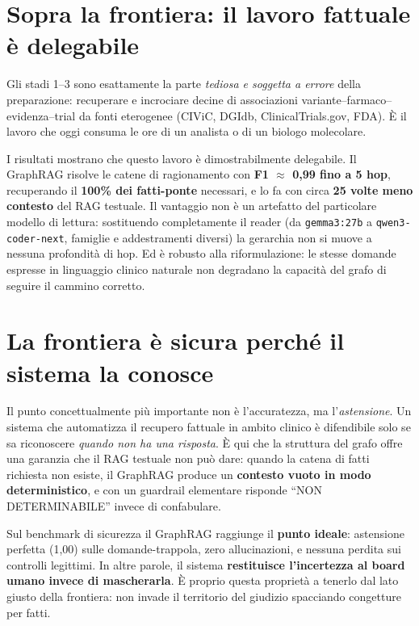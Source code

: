 \documentclass[11pt,a4paper]{report}
\begin{document}
\section{Sopra la frontiera: il lavoro fattuale è delegabile}

Gli stadi 1--3 sono esattamente la parte \emph{tediosa e soggetta a errore}
della preparazione: recuperare e incrociare decine di associazioni
variante--farmaco--evidenza--trial da fonti eterogenee (CIViC, DGIdb,
ClinicalTrials.gov, FDA). È il lavoro che oggi consuma le ore di un analista
o di un biologo molecolare.

I risultati mostrano che questo lavoro è dimostrabilmente delegabile. Il
GraphRAG risolve le catene di ragionamento con \textbf{F1 $\approx$ 0,99
fino a 5 hop}, recuperando il \textbf{100\% dei fatti-ponte} necessari, e lo
fa con circa \textbf{25 volte meno contesto} del RAG testuale. Il vantaggio
non è un artefatto del particolare modello di lettura: sostituendo
completamente il reader (da \texttt{gemma3:27b} a \texttt{qwen3-coder-next},
famiglie e addestramenti diversi) la gerarchia non si muove a nessuna
profondità di hop. Ed è robusto alla riformulazione: le stesse domande
espresse in linguaggio clinico naturale non degradano la capacità del grafo
di seguire il cammino corretto.

\section{La frontiera è sicura perché il sistema la conosce}

Il punto concettualmente più importante non è l'accuratezza, ma
l'\emph{astensione}. Un sistema che automatizza il recupero fattuale in
ambito clinico è difendibile solo se sa riconoscere \emph{quando non ha una
risposta}. È qui che la struttura del grafo offre una garanzia che il RAG
testuale non può dare: quando la catena di fatti richiesta non esiste, il
GraphRAG produce un \textbf{contesto vuoto in modo deterministico}, e con un
guardrail elementare risponde ``NON DETERMINABILE'' invece di confabulare.

Sul benchmark di sicurezza il GraphRAG raggiunge il \textbf{punto ideale}:
astensione perfetta (1,00) sulle domande-trappola, zero allucinazioni, e
nessuna perdita sui controlli legittimi. In altre parole, il sistema
\textbf{restituisce l'incertezza al board umano invece di mascherarla}. È
proprio questa proprietà a tenerlo dal lato giusto della frontiera: non
invade il territorio del giudizio spacciando congetture per fatti.
\end{document}
